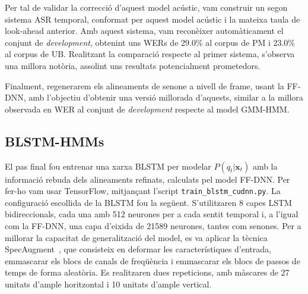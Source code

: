 Per tal de validar la correcció d'aquest model acústic, vam construir un segon sistema ASR temporal, conformat per aquest model acústic i la mateixa taula de look-ahead anterior. Amb aquest sistema, vam reconèixer automàticament el conjunt de \textit{development}, obtenint uns WERs de 29.0\% al corpus de PM i 23.0\% al corpus de UB.
Realitzant la comparació respecte al primer sistema, s'observa una millora notòria, assolint uns resultats potencialment prometedors. 





Finalment, regenerarem els alineaments de senone a nivell de frame, usant la FF-DNN, amb l'objectiu d'obtenir una versió millorada d'aquests, similar a la millora observada en WER al conjunt de \textit{development} respecte al model GMM-HMM.




\subsection{BLSTM-HMMs}
\label{cap05_am_blstm}


El pas final fou entrenar una xarxa BLSTM per modelar $P(q_t|\textbf{x}_t)$ amb la informació rebuda dels alineaments refinats, calculats pel model FF-DNN. Per fer-ho vam usar TensorFlow, mitjançant l'script \texttt{train\_blstm\_cudnn.py}. La configuració escollida de la BLSTM fou la següent.
S'utilitzaren 8 capes LSTM bidireccionals, cada una amb 512 neurones per a cada sentit temporal i, a l'igual com la FF-DNN, una capa d'eixida de 21589 neurones, tantes com senones.
Per a millorar la capacitat de generalització del model, es va aplicar la tècnica SpecAugment~\cite{park2019specaugment}, que consisteix en deformar les característiques d'entrada, emmascarar els blocs de canals de freqüència i emmascarar els blocs de passos de temps de forma aleatòria. Es realitzaren dues repeticions, amb màscares de 27 unitats d'ample horitzontal i 10 unitats d'ample vertical.


